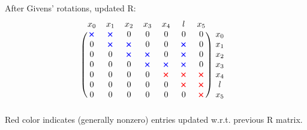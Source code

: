 \documentclass[a4paper]{scrreprt}
\newcommand{\bluex}{\color{blue}\pmb{\times}}
\newcommand{\redx}{\color{red}\pmb{\times}}
\begin{document}
\section{}
After Givens' rotations, updated R: 
\begin{gather}
	\begin{blockarray}{cccccccc}
	x_0 & x_1 & x_2 & x_3 & x_4 & l & x_5 \\
	\begin{block}{(ccccccc)c}
	  \bluex & \bluex & 0 & 0 & 0 & 0 & 0 & x_0 \\
	  0 & \bluex & \bluex & 0 & 0 & \bluex & 0 & x_1 \\
	  0 & 0 & \bluex & \bluex & 0 & \bluex & 0 & x_2 \\
	  0 & 0 & 0 & \bluex & \bluex & \bluex & 0 & x_3 \\
	  0 & 0 & 0 & 0 & \redx & \redx & \redx & x_4 \\
	  0 & 0 & 0 & 0 & 0 & \redx & \redx & l \\
	  0 & 0 & 0 & 0 & 0 & 0 & \redx & x_5 \\
	\end{block}
	\end{blockarray}
\end{gather}
Red color indicates (generally nonzero) entries updated w.r.t. previous R 
matrix. 
\end{document}
